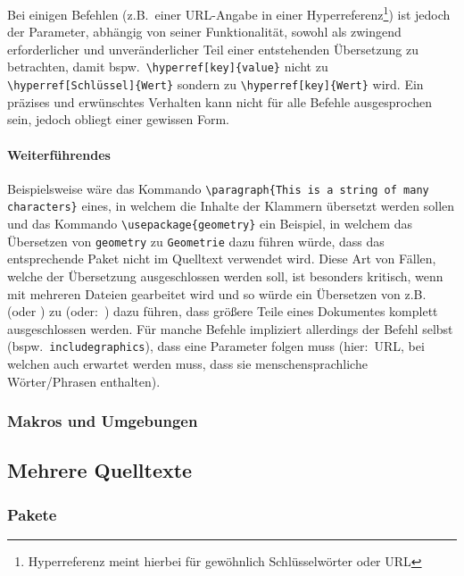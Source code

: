 Bei einigen Befehlen (z.B.\ einer URL-Angabe in einer Hyperreferenz\footnote{Hyperreferenz meint hierbei für gewöhnlich Schlüsselwörter oder URL}) ist jedoch der Parameter, abhängig von seiner Funktionalität, sowohl als zwingend erforderlicher und unveränderlicher Teil einer entstehenden Übersetzung zu betrachten, damit bspw.\ \verb|\hyperref[key]{value}| nicht zu \verb|\hyperref[Schlüssel]{Wert}| sondern zu \verb|\hyperref[key]{Wert}| wird. Ein präzises und erwünschtes Verhalten kann nicht für alle Befehle ausgesprochen sein, jedoch obliegt einer gewissen Form.


\paragraph{Weiterführendes}
Beispielsweise wäre das Kommando \verb|\paragraph{This is a string of many characters}| eines, in welchem die Inhalte der Klammern übersetzt werden sollen und das Kommando \verb|\usepackage{geometry}| ein Beispiel, in welchem das Übersetzen von \verb|geometry| zu \verb|Geometrie| dazu führen würde, dass das entsprechende Paket nicht im Quelltext verwendet wird. Diese Art von Fällen, welche der Übersetzung ausgeschlossen werden soll, ist besonders kritisch, wenn mit mehreren Dateien gearbeitet wird und so würde ein Übersetzen von z.B.\ \verb|| (oder \verb||) zu \verb|| (oder:\ \verb||) dazu führen, dass größere Teile eines Dokumentes komplett ausgeschlossen werden. 
Für manche Befehle impliziert allerdings der Befehl selbst (bspw.\ \texttt{includegraphics}), dass eine Parameter folgen muss (hier:\ URL, bei welchen auch erwartet werden muss, dass sie menschensprachliche Wörter/Phrasen enthalten). 




\subsubsection{Makros und Umgebungen}

\subsection{Mehrere Quelltexte}
\subsubsection{Pakete}




